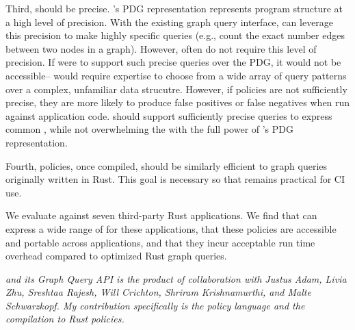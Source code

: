 Third, \syslang{} should be precise.
%
\sys{}'s PDG representation represents program structure at a high level of precision.
%
%
With the existing graph query interface, \writers{} can leverage this precision to make highly specific queries
(e.g., count the exact number edges between two nodes in a graph). 
%
However, \policies{} often do not require this level of precision.
%
If \syslang{} were to support such precise queries over the PDG, it would not be accessible--\ces{} would require expertise
to choose from a wide array of query patterns over a complex, unfamiliar data strucutre.
%
However, if policies are not sufficiently precise, they are more likely to produce false positives or false negatives when run against application code.
%
\syslang{} should support sufficiently precise queries to express common \policies{}, 
while not overwhelming the \writer{} with the full power of \sys{}'s PDG representation. 

Fourth, \syslang{} policies, once compiled, should be similarly efficient to graph queries originally written in Rust.
%
This goal is necessary so that \sys{} remains practical for CI use.

We evaluate \syslang{} against seven third-party Rust applications.
%
We find that \syslang{} can express a wide range of \policies{} for these applications,
that these policies are accessible and portable across applications,
and that they incur acceptable run time overhead compared to optimized Rust graph queries.
%

\emph{\sys{} and its Graph Query API is the product of collaboration with Justus Adam, Livia Zhu, Sreshtaa Rajesh, 
Will Crichton, Shriram Krishnamurthi, and Malte Schwarzkopf.
My contribution specifically is the \syslang{} policy language and the compilation to Rust policies.}
